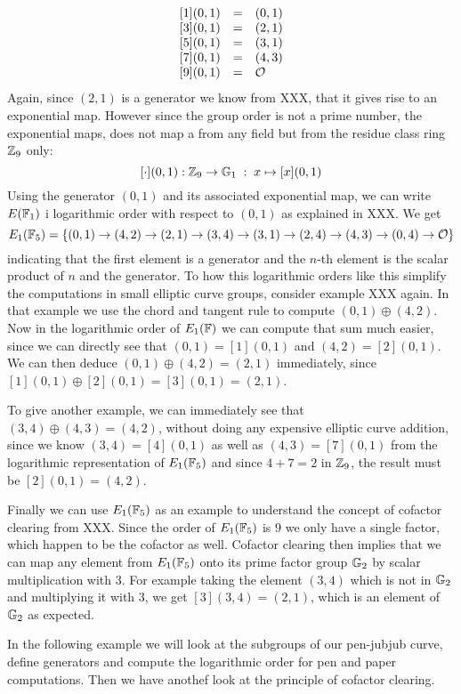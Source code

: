 \begin{example}
$$\begin{array}{lccr}
{}\begin{array}{lcl}
{}[1](0,1) &=& (0, 1) \\
{}[3](0,1) &=& (2, 1) \\
{}[5](0,1) &=& (3, 1) \\
{}[7](0,1) &=& (4, 3) \\
{}[9](0,1) &=& \mathcal{O}
\end{array}
\end{array}
$$
Again, since $(2,1)$ is a generator we know from XXX, that it gives rise to an exponential map. However since the group order is not a prime number, the exponential maps, does not map a from any field but from the residue class ring $\mathbb{Z}_9$ only:
$$
[\cdot](0,1): \mathbb{Z}_9 \to \mathbb{G}_1\; : \; x\mapsto [x](0,1) 
$$
Using the generator $(0,1)$ and its associated exponential map, we can write $E(\mathbb{F}_1)$ i logarithmic order with respect to $(0,1)$ as explained in XXX. We get
$$
E_1(\mathbb{F}_5) = \{(0, 1)\to (4, 2)\to (2, 1)\to (3, 4)\to (3, 1)\to (2, 4)\to (4, 3)\to (0, 4)\to \mathcal{O} \}
$$
indicating that the first element is a generator and the $n$-th element is the scalar product of $n$ and the generator. To how this logarithmic orders like this simplify the computations in small elliptic curve groups, consider example XXX again. In that example we use the chord and tangent rule to compute $(0,1)\oplus (4,2)$. Now in the logarithmic order of $E_1(\mathbb{F})$ we can compute that sum much easier, since we can directly see that $(0,1)=[1](0,1)$ and $(4,2)=[2](0,1)$. We can then deduce $(0,1)\oplus (4,2)= (2,1)$ immediately, since $[1](0,1)\oplus [2](0,1)= [3](0,1)=(2,1)$.

To give another example, we can immediately see that $(3,4)\oplus (4,3) = (4,2)$, without doing any expensive elliptic curve addition, since we know $(3,4)= [4](0,1)$ as well as $(4,3)= [7](0,1)$ from the logarithmic representation of $E_1(\mathbb{F}_5)$ and since $4+7 = 2$ in $\mathbb{Z}_9$, the result must be $[2](0,1)=(4,2)$.

Finally we can use $E_1(\mathbb{F}_5)$ as an example to understand the concept of cofactor clearing from XXX. Since the order of $E_1(\mathbb{F}_5)$ is $9$ we only have a single factor, which happen to be the cofactor as well. Cofactor clearing then implies that we can map any element from $E_1(\mathbb{F}_5)$ onto its prime factor group $\mathbb{G}_2$ by scalar multiplication with $3$. For example taking the element $(3,4)$ which is not in $\mathbb{G}_2$ and multiplying it with $3$, we get $[3](3,4)= (2,1)$, which is an element of $\mathbb{G}_2$ as expected.
\end{example}
In the following example we will look at the subgroups of our pen-jubjub curve, define generators and compute the logarithmic order for pen and paper computations. Then we have anothef look at the principle of cofactor clearing.
